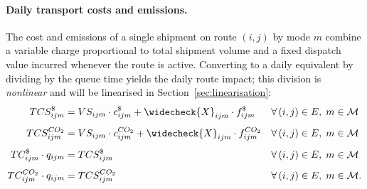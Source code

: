 \paragraph{Daily transport costs and emissions.}
The cost and emissions of a single shipment on route $(i,j)$ by mode $m$ combine
a variable charge proportional to total shipment volume and a fixed
dispatch value incurred whenever the route is active. Converting to
a daily equivalent by dividing by the queue time yields the daily
route impact; this division is \emph{nonlinear} and will be
linearised in Section~\ref{sec:linearisation}:
%
\begin{align}
  TCS^{\$}_{ijm}
  &= VS_{ijm}\cdot c^{\$}_{ijm}
     + \widecheck{X}_{ijm}\cdot f^{\$}_{ijm}
  && \forall\,(i,j)\in E,\;m\in\mathcal{M}
  \label{eq:cost-ship-money}\\[4pt]
  TCS^{CO_2}_{ijm}
  &= VS_{ijm}\cdot c^{CO_2}_{ijm}
     + \widecheck{X}_{ijm}\cdot f^{CO_2}_{ijm}
  && \forall\,(i,j)\in E,\;m\in\mathcal{M}
  \label{eq:cost-ship-emissions}\\[4pt]
  TC^{\$}_{ijm}\cdot q_{ijm}
  &= TCS^{\$}_{ijm}
  && \forall\,(i,j)\in E,\;m\in\mathcal{M}
  \label{eq:cost-daily-money}\\[4pt]
  TC^{CO_2}_{ijm}\cdot q_{ijm}
  &= TCS^{CO_2}_{ijm}
  && \forall\,(i,j)\in E,\;m\in\mathcal{M}.
  \label{eq:cost-daily-emissions}
\end{align}
